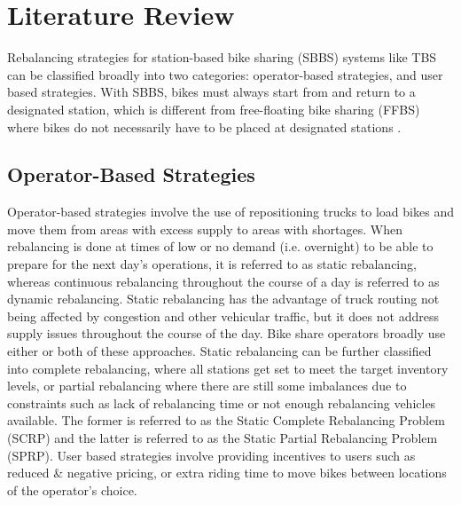 \documentclass[conference]{IEEEtran}
\begin{document}
\section{Literature Review}
Rebalancing strategies for station-based bike sharing (SBBS) systems like TBS can be classified broadly into two categories: operator-based strategies, and user based strategies. With SBBS, bikes must always start from and return to a designated station, which is different from free-floating bike sharing (FFBS) where bikes do not necessarily have to be placed at designated stations \cite{pal_zhang}.


\subsection{Operator-Based Strategies}
Operator-based strategies involve the use of repositioning trucks to load bikes and move them from areas with excess supply to areas with shortages. When rebalancing is done at times of low or no demand (i.e. overnight) to be able to prepare for the next day's operations, it is referred to as static rebalancing, whereas continuous rebalancing throughout the course of a day is referred to as dynamic rebalancing. Static rebalancing has the advantage of truck routing not being affected by congestion and other vehicular traffic, but it does not address supply issues throughout the course of the day. Bike share operators broadly use either or both of these approaches. Static rebalancing can be further classified into complete rebalancing, where all stations get set to meet the target inventory levels, or partial rebalancing where there are still some imbalances due to constraints such as lack of rebalancing time or not enough rebalancing vehicles available. The former is referred to as the Static Complete Rebalancing Problem (SCRP) and the latter is referred to as the Static Partial Rebalancing Problem (SPRP). User based strategies involve providing incentives to users such as reduced \& negative pricing, or extra riding time to move bikes between locations of the operator's choice.
\end{document}
